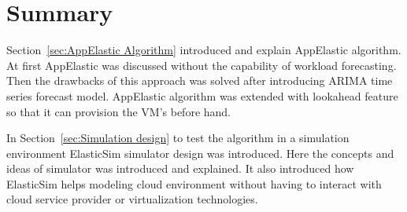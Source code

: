  \section{Summary}
 \label{sec:Summary}
  Section~\ref{sec:AppElastic Algorithm} introduced and explain AppElastic algorithm. At first AppElastic was discussed without the capability of workload forecasting. Then the drawbacks of this approach was solved after introducing ARIMA time series forecast model. AppElastic algorithm was extended with lookahead feature so that it can provision the VM's before hand.

 In Section~\ref{sec:Simulation design} to test the algorithm in a simulation environment ElasticSim simulator design was introduced. Here  the concepts and ideas of simulator was introduced and explained. It also introduced how ElasticSim helps modeling cloud environment without having to interact with cloud service provider or virtualization technologies.
